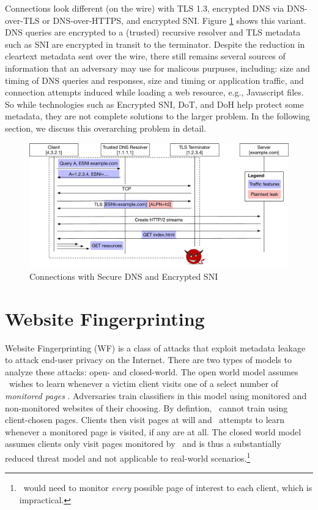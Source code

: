 \documentclass[runningheads]{llncs}
\begin{document}
Connections look different (on the wire) with TLS 1.3, encrypted DNS via DNS-over-TLS or
DNS-over-HTTPS, and encrypted SNI. Figure \ref{fig:connections-now} shows this variant.
DNS queries are encrypted to a (trusted) recursive resolver and TLS metadata such as SNI
are encrypted in transit to the terminator. Despite the reduction in cleartext metadata
sent over the wire, there still remains several sources of information that an adversary
may use for malicous purpuses, including: size and timing of DNS queries and responses, 
size and timing or application traffic, and connection attempts induced while loading a 
web resource, e.g., Javascript files. So while technologies such as Encrypted SNI, DoT,
and DoH help protect some metadata, they are not complete solutions to the larger problem.
In the following section, we discuss this overarching problem in detail.

\begin{figure}
\includegraphics[scale=0.35]{figures/connection_flow_now}
\caption{Connections with Secure DNS and Encrypted SNI}
\label{fig:connections-now}
\end{figure}


\section{Website Fingerprinting}
Website Fingerprinting (WF) is a class of attacks that exploit metadata leakage to attack
end-user privacy on the Internet. There are two types of models to analyze these attacks:
open- and closed-world. The open world model assumes \adv\ wishes to learn whenever a victim
client visits one of a select number of \emph{monitored pages} \cite{wang2016website}. Adversaries train 
classifiers in this model using monitored and non-monitored websites of their choosing. By
defintion, \adv\ cannot train using client-chosen pages. Clients then visit pages at will
and \adv\ attempts to learn whenever a monitored page is visited, if any are at all. The closed
world model assumes clients only visit pages monitored by \adv\ and is thus a substantially
reduced threat model and not applicable to real-world scenarios.\footnote{\adv\ would need to
monitor \emph{every} possible page of interest to each client, which is impractical.}
\end{document}
